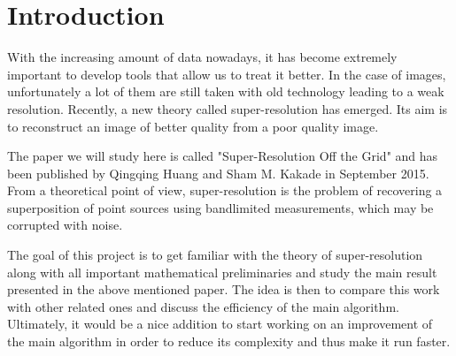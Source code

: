 \chapter{Introduction}
With the increasing amount of data nowadays, it has become extremely important to develop tools that allow us to treat it better. In the case of images, unfortunately a lot of them are still taken with old technology leading to a weak resolution. Recently, a new theory called super-resolution has emerged. Its aim is to reconstruct an image of better quality from a poor quality image.\par 

The paper we will study here is called "Super-Resolution Off the Grid" and has been published by Qingqing Huang and Sham M. Kakade in September 2015. From a theoretical point of view, super-resolution is the problem of recovering a superposition of point sources using bandlimited measurements, which may be corrupted with noise.\par 

The goal of this project is to get familiar with the theory of super-resolution along with all important mathematical preliminaries and study the main result presented in the above mentioned paper. The idea is then to compare this work with other related ones and discuss the efficiency of the main algorithm. Ultimately, it would be a nice addition to start working on an improvement of the main algorithm in order to reduce its complexity and thus make it run faster.